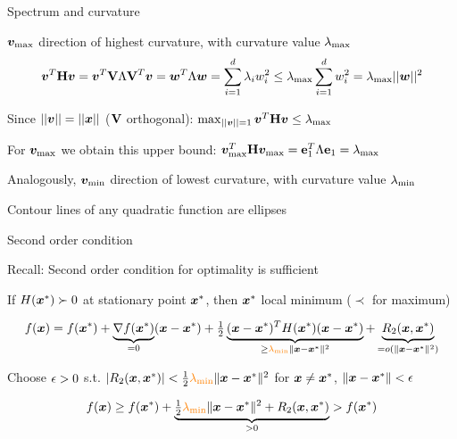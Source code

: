 \documentclass[11pt,compress,t,notes=noshow, xcolor=table]{beamer}
\begin{document}
\begin{framei}[fs=footnotesize]{Spectrum and curvature}
\item $\bm{v}_\text{max}$ direction of highest curvature, with curvature value $\lambda_\text{max}$
$$
\bm{v}^T \mathbf{H} \bm{v} = \bm{v}^T \mathbf{V} \Lambda \mathbf{V}^T \bm{v} = \bm{w}^T \Lambda \bm{w} = 
\sum\limits_{i=1}^d \lambda_i w_i^2 \le \lambda_\text{max} \sum\limits_{i=1}^d w_i^2 = \lambda_\text{max} || \bm{w} ||^2
$$
\item Since $|| \bm{v} || = || \bm{x} ||$ ($\mathbf{V}$ orthogonal): 
$\max_{|| \bm{v} || = 1} \bm{v}^T \mathbf{H} \bm{v} \le \lambda_\text{max}$
\item For $\bm{v}_\text{max}$ we obtain this upper bound:
$\bm{v}_\text{max}^T \mathbf{H} \bm{v}_\text{max} = \mathbf{e}_1^T \Lambda \mathbf{e}_1 = \lambda_\text{max}$ 
\item Analogously, $\bm{v}_\text{min}$ direction of lowest curvature, with curvature value $\lambda_\text{min}$
\item Contour lines of any quadratic function are ellipses
\end{framei}

\begin{framei}[fs=footnotesize]{Second order condition}
\item Recall: Second order condition for optimality is sufficient
\item If $H(\bm{x}^\ast) \succ 0$ at stationary point $\bm{x}^\ast$, then $\bm{x}^\ast$ local minimum ($\prec$ for maximum)
\item[] \begin{equation*}
f(\bm{x}) = f(\bm{x}^\ast) + \underbrace{\nabla f(\bm{x}^\ast)}_{=0}(\bm{x}-\bm{x}^\ast) + \tfrac{1}{2}\underbrace{(\bm{x}-\bm{x}^\ast)^T H(\bm{x}^\ast)(\bm{x}-\bm{x}^\ast)}_{\ge \textcolor{orange}{\lambda_\text{min}} \|\bm{x}-\bm{x}^\ast\|^2} + \underbrace{R_2(\bm{x},\bm{x}^\ast)}_{=o(\|\bm{x}-\bm{x}^\ast\|^2)}
\end{equation*}
\item Choose $\epsilon>0$ s.t. $|R_2(\bm{x},\bm{x}^\ast)| < \tfrac{1}{2} \textcolor{orange}{\lambda_\text{min}} \|\bm{x}-\bm{x}^\ast\|^2$ for $\bm{x} \neq \bm{x}^\ast$, $\|\bm{x}-\bm{x}^\ast\|<\epsilon$
\item[] \begin{equation*}
f(\bm{x}) \ge f(\bm{x}^\ast) + \underbrace{\tfrac{1}{2} \textcolor{orange}{\lambda_\text{min}} \|\bm{x}-\bm{x}^\ast\|^2 + R_2(\bm{x},\bm{x}^\ast)}_{>0} > f(\bm{x}^\ast)
\end{equation*}
\end{framei}
\end{document}
